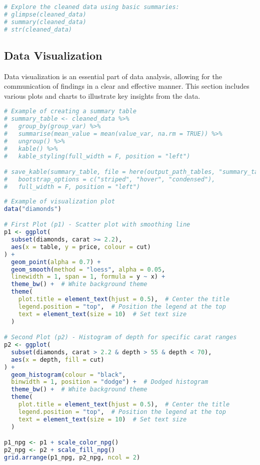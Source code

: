 \documentclass[
  12pt,
]{article}
\begin{document}
\begin{lstlisting}[language=R]
# Explore the cleaned data using basic summaries:
# glimpse(cleaned_data)
# summary(cleaned_data)
# str(cleaned_data)
\end{lstlisting}

\subsection{Data Visualization}\label{data-visualization}

Data visualization is an essential part of data analysis, allowing for
the communication of findings in a clear and effective manner. This
section includes various plots and charts to illustrate key insights
from the data.

\begin{lstlisting}[language=R]
# Example of creating a summary table 
# summary_table <- cleaned_data %>%
#   group_by(group_var) %>%
#   summarise(mean_value = mean(value_var, na.rm = TRUE)) %>%
#   ungroup() %>%
#   kable() %>%
#   kable_styling(full_width = F, position = "left") 

# save_kable(summary_table, file = here(output_path_tables, "summary_table.html"),
#   bootstrap_options = c("striped", "hover", "condensed"),
#   full_width = F, position = "left")
\end{lstlisting}

\begin{lstlisting}[language=R]
# Example of visualization plot
data("diamonds")

# First Plot (p1) - Scatter plot with smoothing line
p1 <- ggplot(
  subset(diamonds, carat >= 2.2),
  aes(x = table, y = price, colour = cut)
) +
  geom_point(alpha = 0.7) +  
  geom_smooth(method = "loess", alpha = 0.05,
  linewidth = 1, span = 1, formula = y ~ x) +  
  theme_bw() +  # White background theme
  theme(
    plot.title = element_text(hjust = 0.5),  # Center the title
    legend.position = "top",  # Position the legend at the top
    text = element_text(size = 10)  # Set text size
  )

# Second Plot (p2) - Histogram of depth for specific carat ranges
p2 <- ggplot(
  subset(diamonds, carat > 2.2 & depth > 55 & depth < 70),
  aes(x = depth, fill = cut)
) +
  geom_histogram(colour = "black",
  binwidth = 1, position = "dodge") +  # Dodged histogram
  theme_bw() +  # White background theme
  theme(
    plot.title = element_text(hjust = 0.5),  # Center the title
    legend.position = "top",  # Position the legend at the top
    text = element_text(size = 10)  # Set text size
  )

p1_npg <- p1 + scale_color_npg()
p2_npg <- p2 + scale_fill_npg()
grid.arrange(p1_npg, p2_npg, ncol = 2)
\end{lstlisting}
\end{document}
